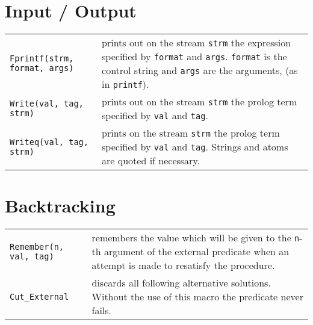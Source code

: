 \section{Input / Output}
\begin{tabular}{|p{6cm}p{9cm}|}
\hline
{\tt Fprintf(strm, format, args)} &
prints out on the stream {\tt strm} the expression specified by
{\tt format} and {\tt args}. {\tt format} is the control string and
{\tt args} are the arguments, (as in {\tt printf}). \\

{\tt Write(val, tag, strm)} &
prints out on the stream {\tt strm} the prolog term specified by
{\tt val} and {\tt tag}. \\

{\tt Writeq(val, tag, strm)} &
prints on the stream {\tt strm} the prolog term specified by 
{\tt val} and {\tt tag}. Strings and atoms are quoted if necessary.\\ 
\hline
\end{tabular}

\section{Backtracking}
\begin{tabular}{|p{6cm}p{9cm}|}
\hline
{\tt Remember(n, val, tag)} & 
remembers the value which will be given to the {\tt n}-th argument of the
external predicate when an attempt is made to resatisfy the procedure. \\
{\tt Cut_External} &
discards all following alternative solutions. Without the use of this macro
the predicate never fails.  \\
\hline
\end{tabular}

